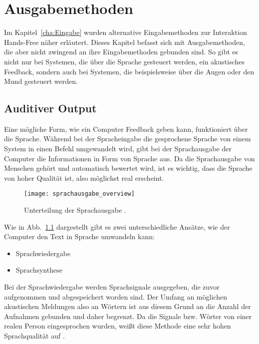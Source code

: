 \chapter{Ausgabemethoden}
\label{cha:Ausgabe}

Im Kapitel~\ref{cha:Eingabe} wurden alternative Eingabemethoden zur Interaktion Hands-Free näher erläutert. Dieses Kapitel befasst sich mit Ausgabemethoden, die aber nicht zwingend an ihre Eingabemethoden gebunden sind. So gibt es nicht nur bei Systemen, die über die Sprache gesteuert werden, ein akustisches Feedback, sondern auch bei Systemen, die beispielsweise über die Augen oder den Mund gesteuert werden. 

\section{Auditiver Output}

Eine mögliche Form, wie ein Computer Feedback geben kann, funktioniert über die Sprache. Während bei der Spracheingabe die gesprochene Sprache von einem System in einen Befehl umgewandelt wird, gibt bei der Sprachausgabe der Computer die Informationen in Form von Sprache aus. Da die Sprachausgabe von Menschen gehört und automatisch bewertet wird, ist es wichtig, dass die Sprache von hoher Qualität ist, also möglichst real erscheint. 

	\begin{figure}
	\centering
	\texttt{[image: sprachausgabe\_overview]}
	\caption{Unterteilung der Sprachausgabe \cite{FellbaumSprache}.}
	\label{fig:SprachausgabeOverview}
	\end{figure}
	
\newpage
Wie in Abb.~\ref{fig:SprachausgabeOverview} dargestellt gibt es zwei unterschiedliche Ansätze, wie der Computer den Text in Sprache umwandeln kann:
\begin{itemize}
      \item Sprachwiedergabe
      \item Sprachsynthese
\end{itemize}
\newline \newline
Bei der Sprachwiedergabe werden Sprachsignale ausgegeben, die zuvor aufgenommen und abgespeichert worden sind. Der Umfang an möglichen akustischen Meldungen also an Wörtern ist aus diesem Grund an die Anzahl der Aufnahmen gebunden und daher begrenzt. Da die Signale bzw. Wörter von einer realen Person eingesprochen wurden, weißt diese Methode eine sehr hohen Sprachqualität auf \cite{KaufmannPfisterSprache}.

